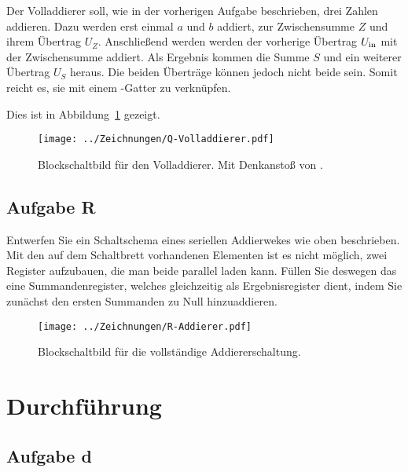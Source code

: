 Der Volladdierer soll, wie in der vorherigen Aufgabe beschrieben, drei Zahlen
addieren. Dazu werden erst einmal $a$ und $b$ addiert, zur Zwischensumme $Z$
und ihrem Übertrag $U_Z$. Anschließend werden werden der vorherige Übertrag
$U_\text{in}$ mit der Zwischensumme addiert. Als Ergebnis kommen die Summe $S$ und ein
weiterer Übertrag $U_S$ heraus. Die beiden Überträge können jedoch nicht beide
\thigh{} sein. Somit reicht es, sie mit einem \tor-Gatter zu verknüpfen.

Dies ist in Abbildung~\ref{fig:Q-Volladdierer} gezeigt.

\begin{figure}[htbp]
	\centering
	\texttt{[image: ../Zeichnungen/Q-Volladdierer.pdf]}
	\caption{%
		Blockschaltbild für den Volladdierer. Mit Denkanstoß von
		\cite{wikipedia/Volladdierer}.
	}
	\label{fig:Q-Volladdierer}
\end{figure}

\FloatBarrier
\subsection{Aufgabe R}

\begin{problem}
	Entwerfen Sie ein Schaltschema eines seriellen Addierwekes wie oben
	beschrieben. Mit den auf dem Schaltbrett vorhandenen Elementen ist es nicht
	möglich, zwei Register aufzubauen, die man beide parallel laden kann.
	Füllen Sie deswegen das eine Summandenregister, welches gleichzeitig als
	Ergebnisregister dient, indem Sie zunächst den ersten Summanden zu Null
	hinzuaddieren.
\end{problem}

\begin{figure}[htbp]
	\centering
	\texttt{[image: ../Zeichnungen/R-Addierer.pdf]}
	\caption{%
		Blockschaltbild für die vollständige Addiererschaltung.
	}
	\label{fig:R-Addierer}
\end{figure}


\section{Durchführung}

\subsection{Aufgabe d}

